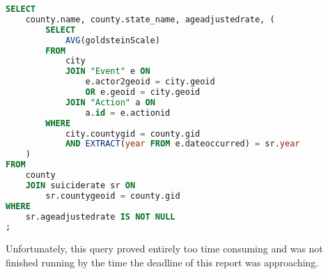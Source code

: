 \begin{lstlisting}[language=SQL]
SELECT
    county.name, county.state_name, ageadjustedrate, (
        SELECT
            AVG(goldsteinScale)
        FROM
            city
            JOIN "Event" e ON 
                e.actor2geoid = city.geoid 
                OR e.geoid = city.geoid
            JOIN "Action" a ON 
                a.id = e.actionid
        WHERE
            city.countygid = county.gid 
            AND EXTRACT(year FROM e.dateoccurred) = sr.year
    )
FROM
    county
    JOIN suiciderate sr ON 
        sr.countygeoid = county.gid
WHERE
    sr.ageadjustedrate IS NOT NULL
;
\end{lstlisting}

Unfortunately, this query proved entirely too time consuming and was not finished running by the time the deadline of this report was approaching.

